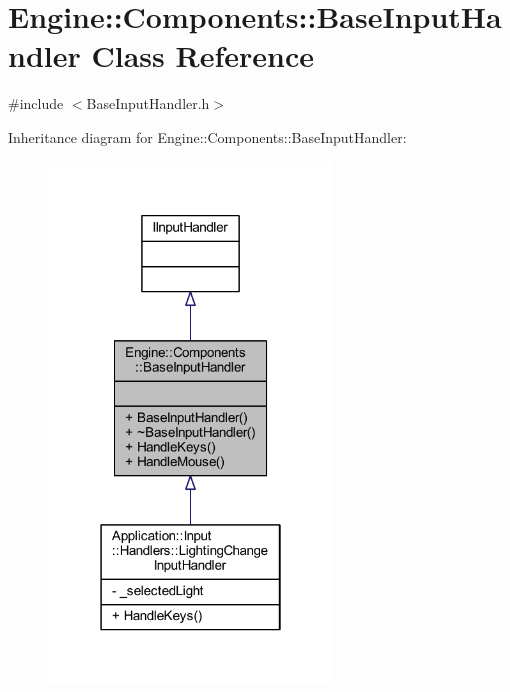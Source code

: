 \hypertarget{classEngine_1_1Components_1_1BaseInputHandler}{}\section{Engine\+:\+:Components\+:\+:Base\+Input\+Handler Class Reference}
\label{classEngine_1_1Components_1_1BaseInputHandler}


{\ttfamily \#include $<$Base\+Input\+Handler.\+h$>$}



Inheritance diagram for Engine\+:\+:Components\+:\+:Base\+Input\+Handler\+:
\nopagebreak
\begin{figure}[H]
\begin{center}
\leavevmode
\includegraphics[width=214pt]{classEngine_1_1Components_1_1BaseInputHandler__inherit__graph}
\end{center}
\end{figure}


